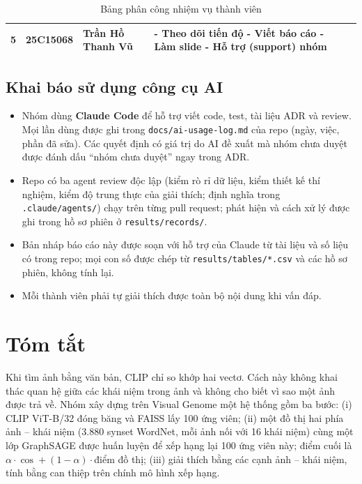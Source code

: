 \documentclass[12pt, a4paper]{article}
\newcommand{\code}[1]{\texttt{#1}}
\begin{document}
\begin{table}[H]
\begin{tabularx}{\textwidth}{|c|c|l|X|c|}
        5 & 25C15068 & Trần Hồ Thanh Vũ & - Theo dõi tiến độ \newline - Viết báo cáo \newline - Làm slide \newline - Hỗ trợ (support) nhóm & \\ \hline
    \end{tabularx}
    \caption{Bảng phân công nhiệm vụ thành viên}
\end{table}

\subsection*{Khai báo sử dụng công cụ AI}
\begin{itemize}
\item Nhóm dùng \textbf{Claude Code} để hỗ trợ viết code, test, tài liệu ADR và review. Mọi lần dùng được ghi trong \code{docs/ai-usage-log.md} của repo (ngày, việc, phần đã sửa). Các quyết định có giá trị do AI đề xuất mà nhóm chưa duyệt được đánh dấu ``nhóm chưa duyệt'' ngay trong ADR.
\item Repo có ba agent review độc lập (kiểm rò rỉ dữ liệu, kiểm thiết kế thí nghiệm, kiểm độ trung thực của giải thích; định nghĩa trong \code{.claude/agents/}) chạy trên từng pull request; phát hiện và cách xử lý được ghi trong hồ sơ phiên ở \code{results/records/}.
\item Bản nháp báo cáo này được soạn với hỗ trợ của Claude từ tài liệu và số liệu có trong repo; mọi con số được chép từ \code{results/tables/*.csv} và các hồ sơ phiên, không tính lại.
\item Mỗi thành viên phải tự giải thích được toàn bộ nội dung khi vấn đáp.
\end{itemize}

\newpage
\clearpage
\section*{Tóm tắt}
Khi tìm ảnh bằng văn bản, CLIP chỉ so khớp hai vectơ. Cách này không khai thác quan hệ giữa các khái niệm trong ảnh và không cho biết vì sao một ảnh được trả về. Nhóm xây dựng trên Visual Genome một hệ thống gồm ba bước: (i) CLIP ViT-B/32 đóng băng và FAISS lấy 100 ứng viên; (ii) một đồ thị hai phía ảnh -- khái niệm (3.880 synset WordNet, mỗi ảnh nối với 16 khái niệm) cùng một lớp GraphSAGE được huấn luyện để xếp hạng lại 100 ứng viên này; điểm cuối là $\alpha\cdot\cos + (1-\alpha)\cdot$điểm đồ thị; (iii) giải thích bằng các cạnh ảnh -- khái niệm, tính bằng can thiệp trên chính mô hình xếp hạng.
\end{document}
